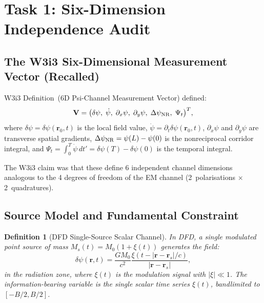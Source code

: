 \documentclass[aps,prd,twocolumn,superscriptaddress,nofootinbib]{revtex4-2}
\newtheorem{definition}{Definition}
\begin{document}
\section{Task 1: Six-Dimension Independence Audit}
\label{sec:independence}

\subsection{The W3i3 Six-Dimensional Measurement Vector (Recalled)}

W3i3 Definition~(6D Psi-Channel Measurement Vector) defined:
\begin{equation}
\mathbf{V} = \bigl(\delta\psi,\; \dot\psi,\; \partial_x\psi,\;
\partial_y\psi,\; \Delta\psi_{\rm NR},\; \Psi_t \bigr)^T,
\label{eq:6D-vector-recalled}
\end{equation}
where $\delta\psi = \delta\psi(\mathbf{r}_0, t)$ is the local field value,
$\dot\psi = \partial_t \delta\psi(\mathbf{r}_0, t)$, $\partial_x\psi$ and
$\partial_y\psi$ are transverse spatial gradients, $\Delta\psi_{\rm NR}
= \psi(L) - \psi(0)$ is the nonreciprocal corridor integral, and
$\Psi_t = \int_0^T \dot\psi\,dt' = \delta\psi(T) - \delta\psi(0)$ is
the temporal integral.

The W3i3 claim was that these define 6 independent channel dimensions
analogous to the 4 degrees of freedom of the EM channel (2~polarisations
$\times$ 2~quadratures).

\subsection{Source Model and Fundamental Constraint}

\begin{definition}[DFD Single-Source Scalar Channel]
\label{def:scalar-channel}
In DFD, a single modulated point source of mass $M_s(t) = M_0(1 + \xi(t))$
generates the field:
\begin{equation}
\delta\psi(\mathbf{r}, t) = \frac{G M_0}{c^2}
\frac{\xi(t - |\mathbf{r} - \mathbf{r}_s|/c)}{|\mathbf{r} - \mathbf{r}_s|},
\label{eq:scalar-field}
\end{equation}
in the radiation zone, where $\xi(t)$ is the modulation signal with
$|\xi| \ll 1$. The information-bearing variable is the single scalar
time series $\xi(t)$, bandlimited to $[-B/2, B/2]$.
\end{definition}
\end{document}
